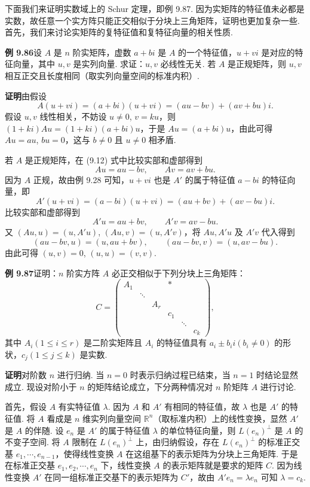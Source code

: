 \documentclass[UTF8, 12pt, fontset=fandol, oneside]{ctexart}
\begin{document}
下面我们来证明实数域上的 Schur 定理，即例 9.87. 因为实矩阵的特征值未必都是实数，故任意一个实方阵只能正交相似于分块上三角矩阵，证明也更加复杂一些. 首先，我们来讨论实矩阵的复特征值和复特征向量的相关性质.

\noindent\textbf{例 9.86}\quad 设 $A$ 是 $n$ 阶实矩阵，虚数 $a+bi$ 是 $A$ 的一个特征值，$u+vi$ 是对应的特征向量，其中 $u,v$ 是实列向量. 求证：$u,v$ 必线性无关. 若 $A$ 是正规矩阵，则 $u,v$ 相互正交且长度相同（取实列向量空间的标准内积）.

\noindent\textbf{证明}\quad 由假设
\begin{equation}
A(u+vi)=(a+bi)(u+vi)=(au-bv)+(av+bu)i.
\tag{9.12}
\end{equation}
假设 $u,v$ 线性相关，不妨设 $u\ne0$, $v=ku$，则 $(1+ki)Au=(1+ki)(a+bi)u$，于是 $Au=(a+bi)u$，由此可得 $Au=au$, $bu=0$，这与 $b\ne0$ 且 $u\ne0$ 相矛盾.

若 $A$ 是正规矩阵，在 (9.12) 式中比较实部和虚部得到
\[
Au=au-bv,\qquad Av=av+bu.
\]
因为 $A$ 正规，故由例 9.28 可知，$u+vi$ 也是 $A'$ 的属于特征值 $a-bi$ 的特征向量，即
\[
A'(u+vi)=(a-bi)(u+vi)=(au+bv)+(av-bu)i.
\]
比较实部和虚部得到
\[
A'u=au+bv,\qquad A'v=av-bu.
\]
又 $(Au,u)=(u,A'u)$, $(Au,v)=(u,A'v)$，将 $Au,A'u$ 及 $A'v$ 代入得到
\[
(au-bv,u)=(u,au+bv),\qquad (au-bv,v)=(u,av-bu).
\]
由此可得 $(u,v)=0$, $(u,u)=(v,v)$.

\noindent\textbf{例 9.87}\quad 证明：$n$ 阶实方阵 $A$ 必正交相似于下列分块上三角矩阵：
\[
C=\begin{pmatrix}
A_1&&&*\\
&\ddots&&\\
&&A_r&\\
&&&c_1\\
&&&&\ddots\\
&&&&&c_k
\end{pmatrix},
\]
其中 $A_i(1\le i\le r)$ 是二阶实矩阵且 $A_i$ 的特征值具有 $a_i\pm b_ii(b_i\ne0)$ 的形状，$c_j(1\le j\le k)$ 是实数.

\noindent\textbf{证明}\quad 对阶数 $n$ 进行归纳. 当 $n=0$ 时表示归纳过程已结束，当 $n=1$ 时结论显然成立. 现设对阶小于 $n$ 的矩阵结论成立，下分两种情况对 $n$ 阶矩阵 $A$ 进行讨论.

首先，假设 $A$ 有实特征值 $\lambda$. 因为 $A$ 和 $A'$ 有相同的特征值，故 $\lambda$ 也是 $A'$ 的特征值. 将 $A$ 看成是 $n$ 维实列向量空间 $\mathbb{R}^n$（取标准内积）上的线性变换，显然 $A'$ 是 $A$ 的伴随. 设 $e_n$ 是 $A'$ 的属于特征值 $\lambda$ 的单位特征向量，则 $L(e_n)^\perp$ 是 $A$ 的不变子空间. 将 $A$ 限制在 $L(e_n)^\perp$ 上，由归纳假设，存在 $L(e_n)^\perp$ 的标准正交基 $e_1,\cdots,e_{n-1}$，使得线性变换 $A$ 在这组基下的表示矩阵为分块上三角矩阵. 于是在标准正交基 $e_1,e_2,\cdots,e_n$ 下，线性变换 $A$ 的表示矩阵就是要求的矩阵 $C$. 因为线性变换 $A'$ 在同一组标准正交基下的表示矩阵为 $C'$，故由 $A'e_n=\lambda e_n$ 可知 $\lambda=c_k$.
\end{document}

